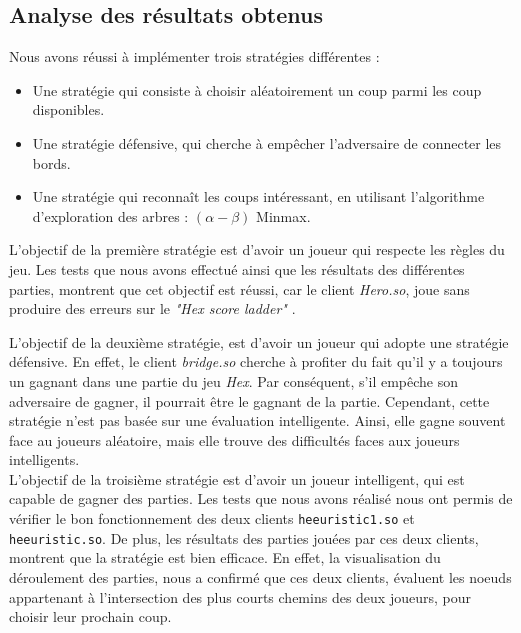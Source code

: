 \documentclass[a4paper,10pt]{article}
\begin{document}
\subsection{Analyse des résultats obtenus}
Nous avons réussi à implémenter trois stratégies différentes :  \\

\begin{itemize}
    \item Une stratégie qui consiste à choisir aléatoirement un coup parmi les coup disponibles. \\
    \item Une stratégie défensive, qui cherche à empêcher l'adversaire de connecter les bords.  \\
    \item Une stratégie qui reconnaît les coups intéressant, en utilisant l'algorithme d'exploration des arbres : $(\alpha -\beta)$ Minmax.  \\
\end{itemize}

L'objectif de la première stratégie est d'avoir un joueur qui respecte les règles du jeu. Les tests que nous avons effectué ainsi que les résultats des différentes parties, montrent que cet objectif est réussi, car le client \textit{Hero.so}, joue sans produire des erreurs sur le \textit{"Hex score ladder"} .
\newline

L'objectif de la deuxième stratégie, est d'avoir un joueur qui adopte une stratégie défensive. En effet, le client \textit{bridge.so} cherche à profiter du fait qu'il y a toujours un gagnant dans une partie du jeu \textit{Hex}. Par conséquent, s'il empêche son adversaire de gagner, il pourrait être le gagnant de la partie. Cependant, cette stratégie n'est pas basée sur une évaluation intelligente. Ainsi, elle gagne souvent face au joueurs aléatoire, mais elle trouve des difficultés faces aux joueurs intelligents. \\

L'objectif de la troisième stratégie est d'avoir un joueur intelligent, qui est capable de gagner des parties. Les tests que nous avons réalisé nous ont permis de vérifier le bon fonctionnement des deux clients \texttt{heeuristic1.so} et \texttt{heeuristic.so}. De plus, les résultats des parties jouées par ces deux clients, montrent que la stratégie est bien efficace. En effet, la visualisation du déroulement des parties, nous a confirmé que ces deux clients, évaluent les noeuds appartenant à l'intersection des plus courts chemins des deux joueurs, pour choisir leur prochain coup. \\
\end{document}

